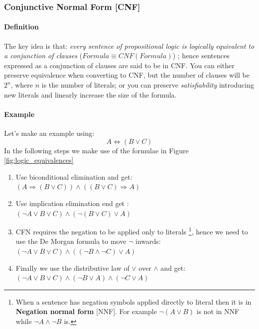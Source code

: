 \documentclass[10pt,a4paper]{article}
\begin{document}
\subsubsection{Conjunctive Normal Form [CNF]}
\label{subsec:cnf}
\paragraph{Definition}
The key idea is that: \textit{every sentence of propositional logic is logically equivalent to a conjunction of clauses} ($Formula\equiv CNF(Formula)$) ; hence sentences expressed as a conjunction of clauses are said to be in CNF. You can either preserve equivalence when converting to CNF, but the number of clauses will be $2^n$, where $n$ is the number of literals; or you can preserve \textit{satisfiability} introducing new literals and linearly increase the size of the formula.\\



\paragraph{Example}
Let's make an example using:
\[A \Leftrightarrow (B \vee C)\]
In the following steps we make use of the formulae in Figure \ref{fig:logic_equivalences}

\begin{enumerate}
\item Use biconditional elimination and get: \\$(A \Rightarrow (B \vee C))\wedge((B \vee C)\Rightarrow A)$
\item Use implication elimination end get :\\$(\neg A \vee B \vee C)\wedge(\neg(B\vee C)\vee A)$
\item CFN requires the negation to be applied only to literals \footnote{When a sentence has negation symbols applied directly to literal then it is in \textbf{Negation normal form} [NNF]. For example $\neg(A\vee B)$ is not in NNF while $\neg A \wedge \neg B$ is.}, hence we need to use the De Morgan formula to move $\neg$ inwards: \\$(\neg A \vee B \vee C)\wedge((\neg B\wedge \neg C)\vee A)$
\item Finally we use the distributive law of $\vee$ over $\wedge$ and get:\\
$(\neg A \vee B \vee C)\wedge(\neg B \vee A)\wedge(\neg C \vee A)$
\end{enumerate}
\end{document}
